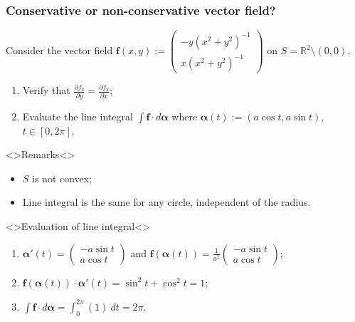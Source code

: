 \documentclass[aspectratio=169,handout]{beamer}
\newcommand{\bR}{\mathbb{R}} %
\newcommand{\ff}{\mathbf{f}}
\newcommand{\aalpha}{\boldsymbol{\alpha}}
\begin{document}
\begin{frame}
    \frametitle{Conservative or non-conservative vector field?}


    \begin{example}
        Consider the vector field \(\ff(x,y) := \left(\begin{smallmatrix}
            -y (x^2 + y^2)^{-1} \\ x (x^2 + y^2)^{-1}
        \end{smallmatrix}\right)\)
        on \(S = \bR^2 \setminus (0,0)\).
        \begin{enumerate}
            \item Verify that \(  \tfrac{\partial f_2}{\partial y} = \tfrac{\partial f_2}{\partial x}\);
            \item Evaluate the line integral \(\int \ff \cdot d\aalpha\) where \(\aalpha(t) := (a \cos t, a \sin t)\), \(t\in [0,2\pi]\).
        \end{enumerate}

    \end{example}

    \begin{block}<>{Remarks}<>
        \begin{itemize}
            \item \(S\) is not convex;
            \item Line integral is the same for any circle, independent of the radius.
        \end{itemize}
    \end{block}

    \begin{block}<>{Evaluation of line integral}<>
        \begin{enumerate}
            \item \(\aalpha'(t) = \left(\begin{smallmatrix}
                -a \sin t \\ a \cos t
            \end{smallmatrix}\right)\) and \(\ff(\aalpha(t)) = \frac{1}{a^2} \left(\begin{smallmatrix}
                -a \sin t \\ a \cos t
            \end{smallmatrix}\right)   \);
            \item \(\ff(\aalpha(t)) \cdot \aalpha'(t) = \sin^2 t + \cos^2 t = 1  \);
            \item \(\int \ff \cdot d\aalpha = \int_{0}^{2\pi} (1) \ dt = 2\pi \).
        \end{enumerate}
    \end{block}

\end{frame}
\end{document}
